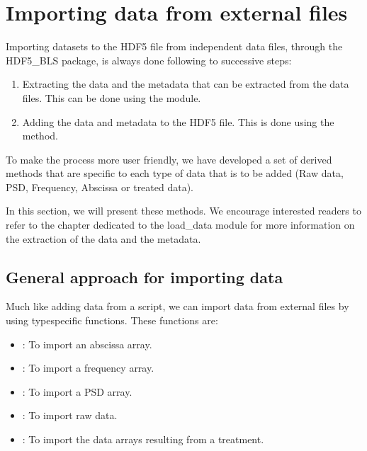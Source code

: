\documentclass[letterpaper,10pt,english]{sphinxmanual}
\begin{document}
\section{Importing data from external files}
\label{\detokenize{source/hdf5_bls_package:importing-data-from-external-files}}
\sphinxAtStartPar
Importing datasets to the HDF5 file from independent data files, through the HDF5\_BLS package, is always done following to successive steps:
\begin{enumerate}
%
\item {} 
\sphinxAtStartPar
Extracting the data and the metadata that can be extracted from the data files. This can be done using the  module.

\item {} 
\sphinxAtStartPar
Adding the data and metadata to the HDF5 file. This is done using the  method.

\end{enumerate}

\sphinxAtStartPar
To make the process more user friendly, we have developed a set of derived methods that are specific to each type of data that is to be added (Raw data, PSD, Frequency, Abscissa or treated data).

\sphinxAtStartPar
In this section, we will present these methods. We encourage interested readers to refer to the chapter dedicated to the load\_data module for more information on the extraction of the data and the metadata.


\subsection{General approach for importing data}
\label{\detokenize{source/hdf5_bls_package:general-approach-for-importing-data}}
\sphinxAtStartPar
Much like adding data from a script, we can import data from external files by using type\sphinxhyphen{}specific functions. These functions are:
\begin{itemize}
\item {} 
\sphinxAtStartPar
{}: To import an abscissa array.

\item {} 
\sphinxAtStartPar
{}: To import a frequency array.

\item {} 
\sphinxAtStartPar
{}: To import a PSD array.

\item {} 
\sphinxAtStartPar
{}: To import raw data.

\item {} 
\sphinxAtStartPar
{}: To import the data arrays resulting from a treatment.

\end{itemize}
\end{document}
